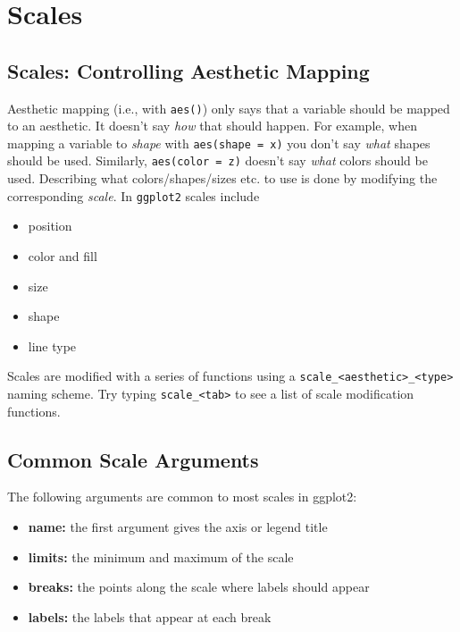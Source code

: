 \documentclass[]{book}
\providecommand{\tightlist}{%
  \setlength{\itemsep}{0pt}\setlength{\parskip}{0pt}}
\begin{document}
\section{Scales}\label{scales}

\subsection{Scales: Controlling Aesthetic
Mapping}\label{scales-controlling-aesthetic-mapping}

Aesthetic mapping (i.e., with \texttt{aes()}) only says that a variable
should be mapped to an aesthetic. It doesn't say \emph{how} that should
happen. For example, when mapping a variable to \emph{shape} with
\texttt{aes(shape\ =\ x)} you don't say \emph{what} shapes should be
used. Similarly, \texttt{aes(color\ =\ z)} doesn't say \emph{what}
colors should be used. Describing what colors/shapes/sizes etc. to use
is done by modifying the corresponding \emph{scale}. In \texttt{ggplot2}
scales include

\begin{itemize}
\tightlist
\item
  position
\item
  color and fill
\item
  size
\item
  shape
\item
  line type
\end{itemize}

Scales are modified with a series of functions using a
\texttt{scale\_\textless{}aesthetic\textgreater{}\_\textless{}type\textgreater{}}
naming scheme. Try typing \texttt{scale\_\textless{}tab\textgreater{}}
to see a list of scale modification functions.

\subsection{Common Scale Arguments}\label{common-scale-arguments}

The following arguments are common to most scales in ggplot2:

\begin{itemize}
\tightlist
\item
  \textbf{name:} the first argument gives the axis or legend title
\item
  \textbf{limits:} the minimum and maximum of the scale
\item
  \textbf{breaks:} the points along the scale where labels should appear
\item
  \textbf{labels:} the labels that appear at each break
\end{itemize}
\end{document}
